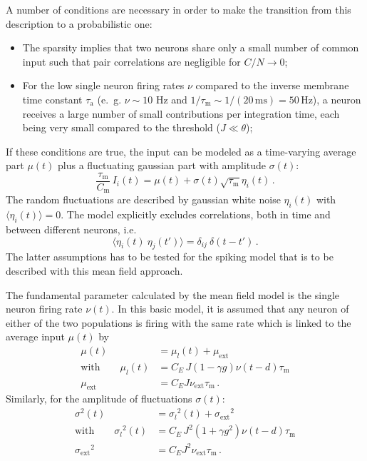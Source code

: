 A number of conditions are necessary in order to make the transition from 
this description to a probabilistic one:
\begin{itemize}
    \item The sparsity implies that 
        two neurons share only a small number of common input such that pair correlations
        are negligible for $C / N \to 0$; 
    \item For the low single neuron firing rates $\nu$ compared to the 
        inverse membrane time constant $\tau_\text{a}$
        (e.~g. $\nu \sim10$ Hz and $1 / \tau_\text{m} \sim 1 / (20\,\text{ms}) = 50\, \text{Hz}$),
        a neuron receives a large number of small contributions per integration 
        time, each being very small compared to the threshold ($J \ll \theta$);
\end{itemize}
If these conditions are true, the input can be modeled as a time-varying average part
$\mu(t)$ plus a fluctuating gaussian part with amplitude $\sigma(t)$:
\begin{equation}
    \frac{\tau_\text{m}}{C_\text{m}} \, I_i(t) =  \mu(t) + \sigma(t) \sqrt{\tau_\text{m}} \eta_i(t) \, .
    \label{eq:input_random}
\end{equation}
The random fluctuations are described by gaussian white noise $\eta_i(t)$ with 
$\langle  \eta_i(t)\rangle = 0$. The model explicitly excludes correlations, 
both in time and between different neurons, i.e.
\begin{equation}
    \langle \eta_i(t) \: \eta_j(t') \rangle = \delta_{ij} \: \delta(t - t')	\, . 
    \label{eq:no_correlations}
\end{equation}
The latter assumptions has to be tested for the spiking model
that is to be described with this mean field approach. 

The fundamental parameter calculated by the mean field model is the single neuron
firing rate $\nu(t)$. In this basic model, it is assumed that any neuron of either 
of the two populations is firing with the same rate which is linked to the 
average input $\mu(t)$ by
\begin{equation}
    \begin{split}
        \mu(t)          &= \mu_l(t) + \mu_\text{ext} \\
        \text{with} \qquad \mu_l(t)        &= C_E \, J (1 - \gamma g) \nu(t - d) \tau_\text{m} \\
        \mu_\text{ext}  &= C_E J \nu_\text{ext} \tau_\text{m} \,.
        \label{eq:mu}
    \end{split}
\end{equation}
Similarly, for the amplitude of fluctuations $\sigma(t)$:
\begin{equation}
    \begin{split}
        \sigma^2(t)     &= {\sigma_l}^2(t) + {\sigma_\text{ext}}^2 \\
        \text{with} \qquad {\sigma_l}^2(t)       
                        &= C_E \, J^2 (1 + \gamma g^2) \nu(t - d) \tau_\text{m} \\
        {\sigma_\text{ext}}^2  &= C_E J^2 \nu_\text{ext} \tau_\text{m} \,.
        \label{eq:sigma}
    \end{split}
\end{equation}

